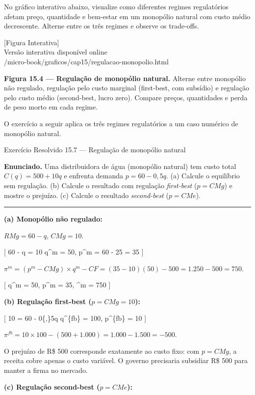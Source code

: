 \documentclass[11pt,twoside,openright]{book}
\newcommand{\figurePlaceholder}[1]{%
  \begin{center}
    \begin{tcolorbox}[
      width=0.85\textwidth,
      colback=graybg,
      colframe=gray,
      boxrule=0.5pt,
      arc=2pt,
      halign=center,
      valign=center,
      height=5cm
    ]
      \centering
      \vfill
      {\sffamily\color{gray}\large [Figura Interativa]}\\[6pt]
      {\sffamily\small\color{gray} Versão interativa disponível online}\\[4pt]
      {\ttfamily\tiny\color{gray} #1}
      \vfill
    \end{tcolorbox}
  \end{center}
}
\begin{document}
No gráfico interativo abaixo, visualize como diferentes regimes
regulatórios afetam preço, quantidade e bem-estar em um monopólio
natural com custo médio decrescente. Alterne entre os três regimes e
observe os trade-offs.

\figurePlaceholder{/micro-book/graficos/cap15/regulacao-monopolio.html}

\textbf{Figura 15.4 --- Regulação de monopólio natural.} Alterne entre
monopólio não regulado, regulação pelo custo marginal (first-best, com
subsídio) e regulação pelo custo médio (second-best, lucro zero).
Compare preços, quantidades e perda de peso morto em cada regime.

O exercício a seguir aplica os três regimes regulatórios a um caso
numérico de monopólio natural.

\begin{exresolvidobox}{Exercício Resolvido 15.7 — Regulação de monopólio natural}

\textbf{Enunciado.} Uma distribuidora de água (monopólio natural) tem
custo total \(C(q) = 500 + 10q\) e enfrenta demanda \(p = 60 - 0{,}5q\).
(a) Calcule o equilíbrio sem regulação. (b) Calcule o resultado com
regulação \emph{first-best} (\(p = CMg\)) e mostre o prejuízo. (c)
Calcule o resultado \emph{second-best} (\(p = CMe\)).

\begin{center}\rule{0.5\linewidth}{0.5pt}\end{center}

\textbf{(a) Monopólio não regulado:}

\(RMg = 60 - q\), \(CMg = 10\).

{[} 60 - q = 10 \implies q\^{}m = 50, \quad p\^{}m = 60 - 25 = 35 {]}

\(\pi^m = (p^m - CMg) \times q^m - CF = (35-10)(50) - 500 = 1.250 - 500 = 750\).

{[} q\^{}m = 50, \quad p\^{}m = 35, \quad \pi\^{}m = 750 {]}

\textbf{(b) Regulação first-best (\(p = CMg = 10\)):}

{[} 10 = 60 - 0\{,\}5q \implies q\^{}\{fb\} = 100, \quad p\^{}\{fb\} =
10 {]}

\(\pi^{fb} = 10 \times 100 - (500 + 1.000) = 1.000 - 1.500 = -500\).

O prejuízo de R\$ 500 corresponde exatamente ao custo fixo: com
\(p = CMg\), a receita cobre apenas o custo variável. O governo
precisaria subsidiar R\$ 500 para manter a firma no mercado.

\textbf{(c) Regulação second-best (\(p = CMe\)):}


\end{exresolvidobox}
\end{document}
